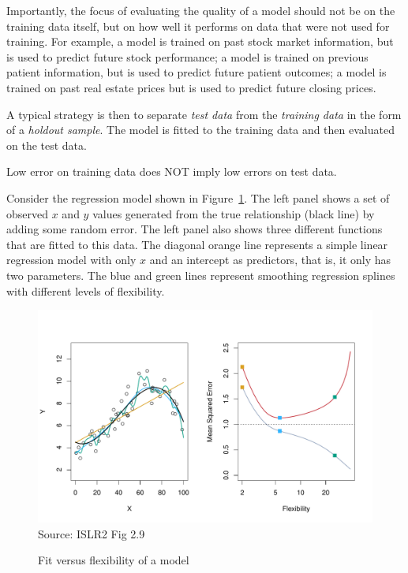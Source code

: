 Importantly, the focus of evaluating the quality of a model should not be on the training data itself, but on how well it performs on data that were not used for training. For example, a model is trained on past stock market information, but is used to predict future stock performance; a model is trained on previous patient information, but is used to predict future patient outcomes; a model is trained on past real estate prices but is used to predict future closing prices. 

A typical strategy is then to separate \emph{test data} from the \emph{training data} in the form of a \emph{holdout sample}. The model is fitted to the training data and then evaluated on the test data.

\begin{tcolorbox}[colback=LavenderBlush2]
Low error on training data does NOT imply low errors on test data.
\end{tcolorbox}

Consider the regression model shown in Figure~\ref{fig:freedom}. The left panel shows a set of observed $x$ and $y$ values generated from the true relationship (black line) by adding some random error. The left panel also shows three different functions that are fitted to this data. The diagonal orange line represents a simple linear regression model with only $x$ and an intercept as predictors, that is, it only has two parameters. The blue and green lines represent smoothing regression splines with different levels of flexibility.

\begin{figure}[b]
\centering
\includegraphics[width=.9\textwidth]{Figures_Chapters_1-6/Chapter2/2_9.pdf} \\

\scriptsize Source: ISLR2 Fig 2.9
\caption{Fit versus flexibility of a model}
\label{fig:freedom}
\end{figure}

